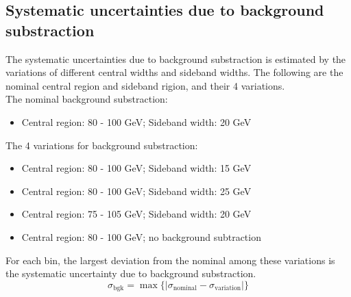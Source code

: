 \subsection{Systematic uncertainties due to background substraction}
\label{sec:sys_background_substraction}
The systematic uncertainties due to background substraction is estimated by the variations of different central widths and sideband widths.
The following are the nominal central region and sideband rigion, and their 4 variations. \\
The nominal background substraction:
\begin{itemize}
\item Central region: 80 - 100 GeV; Sideband width: 20 GeV
\end{itemize}
The 4 variations for background substraction:
\begin{itemize}
\item Central region: 80 - 100 GeV; Sideband width: 15 GeV
\item Central region: 80 - 100 GeV; Sideband width: 25 GeV
\item Central region: 75 - 105 GeV; Sideband width: 20 GeV
\item Central region: 80 - 100 GeV; no background subtraction
\end{itemize}

For each bin, the largest deviation from the nominal among these variations is the systematic uncertainty due to background substraction.
\begin{equation}
\sigma_{\text{bgk}} = \max \{| \sigma_{\text{nominal}} - \sigma_{\text{variation}} |\}
\end{equation}

